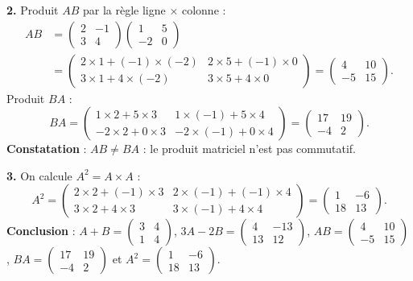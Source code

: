 \documentclass[11pt]{article}
\begin{document}
\begin{exoresolu}
\textbf{2.} Produit $AB$ par la règle ligne $\times$ colonne :
\begin{align*}
AB&=\begin{pmatrix} 2 & -1 \\ 3 & 4 \end{pmatrix}\begin{pmatrix} 1 & 5 \\ -2 & 0 \end{pmatrix}\\
&=\begin{pmatrix} 2\times 1+(-1)\times(-2) & 2\times 5+(-1)\times 0 \\ 3\times 1+4\times(-2) & 3\times 5+4\times 0 \end{pmatrix}
=\begin{pmatrix} 4 & 10 \\ -5 & 15 \end{pmatrix}.
\end{align*}
Produit $BA$ :
\[ BA=\begin{pmatrix} 1\times 2+5\times 3 & 1\times(-1)+5\times 4 \\ -2\times 2+0\times 3 & -2\times(-1)+0\times 4 \end{pmatrix}=\begin{pmatrix} 17 & 19 \\ -4 & 2 \end{pmatrix}. \]
\textbf{Constatation} : $AB\neq BA$ : le produit matriciel n'est pas commutatif.

\textbf{3.} On calcule $A^2=A\times A$ :
\[ A^2=\begin{pmatrix} 2\times 2+(-1)\times 3 & 2\times(-1)+(-1)\times 4 \\ 3\times 2+4\times 3 & 3\times(-1)+4\times 4 \end{pmatrix}=\begin{pmatrix} 1 & -6 \\ 18 & 13 \end{pmatrix}. \]
\textbf{Conclusion} : $A+B=\begin{pmatrix} 3 & 4 \\ 1 & 4 \end{pmatrix}$, $3A-2B=\begin{pmatrix} 4 & -13 \\ 13 & 12 \end{pmatrix}$, $AB=\begin{pmatrix} 4 & 10 \\ -5 & 15 \end{pmatrix}$, $BA=\begin{pmatrix} 17 & 19 \\ -4 & 2 \end{pmatrix}$ et $A^2=\begin{pmatrix} 1 & -6 \\ 18 & 13 \end{pmatrix}$.
\end{exoresolu}
\end{document}

